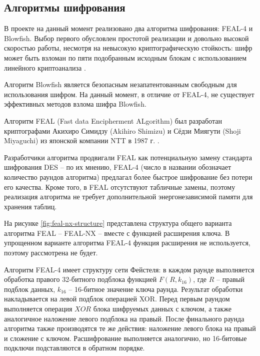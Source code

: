 \newpage
\subsection{Алгоритмы шифрования}

В проекте на данный момент реализовано два алгоритма шифрования:
FEAL-4 и Blowfish. Выбор первого обусловлен простотой реализации и
довольно высокой скоростью работы, несмотря на невысокую криптографическую
стойкость: шифр может быть взломан по пяти подобранным исходным блокам
с использованием линейного криптоанализа \cite{feal-attack}.

Алгоритм Blowfish является безопасным незапатентованным свободным для
использования шифром. На данный момент, в отличие от FEAL-4, не существует
эффективных методов взлома шифра Blowfish.

Алгоритм FEAL (Fast data Encipherment ALgorithm) был разработан криптографами
Акихиро Симидзу (Akihiro Shimizu) и Сёдзи Миягути (Shoji Miyaguchi) из
японской компании NTT в 1987 г. \cite[стр. 206]{panasenko}.

Разработчики алгоритма продвигали FEAL как потенциальную замену стандарта
шифрования DES -- по их мнению, FEAL-4 (число в названии обозначает количество
раундов алгоритма) предлагал более быстрое шифрование без потери его качества.
Кроме того, в FEAL отсутствуют табличные замены, поэтому реализация алгоритма
не требует дополнительной энергонезависимой памяти для хранения таблиц.

На рисунке \ref{fig:feal-nx-structure} представлена структура общего варианта
алгоритма FEAL -- FEAL-NX -- вместе с функцией расширения ключа. В упрощенном
варианте алгоритма FEAL-4 функция расширения не используется, поэтому рассмотрена
не будет.

Алгоритм FEAL-4 имеет структуру сети Фейстеля:
в каждом раунде выполняется обработка правого 32-битного подблока функцией
$F(R,k_{16})$, где $R$ -- правый подблок данных, $k_{16}$ -- 16-битное значение
ключа раунда. Результат обработки накладывается на левой подблок операцией XOR.
Перед первым раундом выполняется операция $XOR$ блока шифруемых данных с
ключом, а также аналогичное наложение левого подблока на правый.
После финального раунда алгоритма также производятся те же действия:
наложение левого блока на правый и сложение с ключом.
Расшифрование выполняется аналогично, но 16-битовые подключи подставляются
в обратном порядке.

